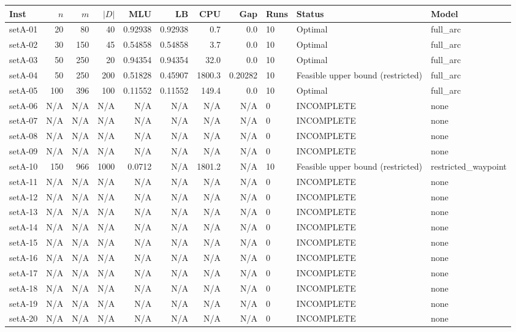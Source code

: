 \begin{tabular}{lrrrrrrrlll}
\toprule
Inst & $n$ & $m$ & $|D|$ & MLU & LB & CPU & Gap & Runs & Status & Model \\ \midrule
setA-01 & 20 & 80 & 40 & 0.92938 & 0.92938 & 0.7 & 0.0 & 10 & Optimal & full\_arc \\
setA-02 & 30 & 150 & 45 & 0.54858 & 0.54858 & 3.7 & 0.0 & 10 & Optimal & full\_arc \\
setA-03 & 50 & 250 & 20 & 0.94354 & 0.94354 & 32.0 & 0.0 & 10 & Optimal & full\_arc \\
setA-04 & 50 & 250 & 200 & 0.51828 & 0.45907 & 1800.3 & 0.20282 & 10 & Feasible upper bound (restricted) & full\_arc \\
setA-05 & 100 & 396 & 100 & 0.11552 & 0.11552 & 149.4 & 0.0 & 10 & Optimal & full\_arc \\
setA-06 & N/A & N/A & N/A & N/A & N/A & N/A & N/A & 0 & INCOMPLETE & none \\
setA-07 & N/A & N/A & N/A & N/A & N/A & N/A & N/A & 0 & INCOMPLETE & none \\
setA-08 & N/A & N/A & N/A & N/A & N/A & N/A & N/A & 0 & INCOMPLETE & none \\
setA-09 & N/A & N/A & N/A & N/A & N/A & N/A & N/A & 0 & INCOMPLETE & none \\
setA-10 & 150 & 966 & 1000 & 0.0712 & N/A & 1801.2 & N/A & 10 & Feasible upper bound (restricted) & restricted\_waypoint \\
setA-11 & N/A & N/A & N/A & N/A & N/A & N/A & N/A & 0 & INCOMPLETE & none \\
setA-12 & N/A & N/A & N/A & N/A & N/A & N/A & N/A & 0 & INCOMPLETE & none \\
setA-13 & N/A & N/A & N/A & N/A & N/A & N/A & N/A & 0 & INCOMPLETE & none \\
setA-14 & N/A & N/A & N/A & N/A & N/A & N/A & N/A & 0 & INCOMPLETE & none \\
setA-15 & N/A & N/A & N/A & N/A & N/A & N/A & N/A & 0 & INCOMPLETE & none \\
setA-16 & N/A & N/A & N/A & N/A & N/A & N/A & N/A & 0 & INCOMPLETE & none \\
setA-17 & N/A & N/A & N/A & N/A & N/A & N/A & N/A & 0 & INCOMPLETE & none \\
setA-18 & N/A & N/A & N/A & N/A & N/A & N/A & N/A & 0 & INCOMPLETE & none \\
setA-19 & N/A & N/A & N/A & N/A & N/A & N/A & N/A & 0 & INCOMPLETE & none \\
setA-20 & N/A & N/A & N/A & N/A & N/A & N/A & N/A & 0 & INCOMPLETE & none \\
\bottomrule
\end{tabular}
